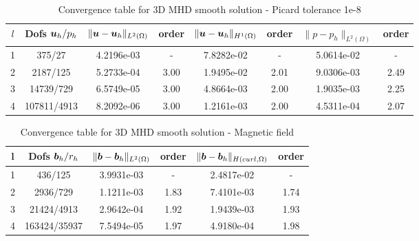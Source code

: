 \begin{table}[h!] \small
\begin{center}
\begin{tabular}{cccccccc}
\hline
$l$ &    Dofs $\boldsymbol u_h/p_h$ & $\|\boldsymbol u-\boldsymbol u_h\|_{L^2(\Omega)}$ & order & $\|\boldsymbol u-\boldsymbol u_h\|_{H^1(\Omega)}$ & order &        $\|{p}-{p}_h\|_{L^2(\Omega)}$ & order \\
\hline
  1 &     375/27 &  4.2196e-03 &     - &  7.8282e-02 &     - &  5.0614e-02 &      - \\
  2 &    2187/125 &  5.2733e-04 &     3.00 &  1.9495e-02 &     2.01 &  9.0306e-03 &      2.49 \\

 3 &   14739/729 &  6.5749e-05 &     3.00 &  4.8664e-03 &     2.00 &  1.9035e-03 &      2.25 \\

 4 &  107811/4913 &  8.2092e-06 &     3.00 &  1.2161e-03 &     2.00 &  4.5311e-04 &      2.07 \\

\hline
\end{tabular}
\caption{Convergence table for 3D MHD smooth solution - Picard tolerance 1e-8}
\label{tab:MHD_3D_smooth_fluids}
\end{center}
\end{table}


\begin{table}[h!] \small
\begin{center}
\begin{tabular}{cccccc}
\hline
l &    Dofs $\boldsymbol b_h/r_h$ & $\|\boldsymbol b-\boldsymbol b_h\|_{L^2(\Omega)}$ & order & $\|\boldsymbol b-\boldsymbol b_h\|_{H(curl,\Omega)}$ & order \\
\hline
1 &     436/125 &  3.9931e-03 &     - &  2.4817e-02 &        - \\
2 &    2936/729 &  1.1211e-03 &     1.83 &  7.4101e-03 &        1.74 \\
3 &   21424/4913 &  2.9642e-04 &     1.92 &  1.9439e-03 &        1.93 \\
4 &  163424/35937 &  7.5494e-05 &     1.97 &  4.9180e-04 &        1.98 \\
\hline
\end{tabular}
\caption{Convergence table for 3D MHD smooth solution - Magnetic field}
\label{tab:MHD_3D_smooth_magnetic}
\end{center}
\end{table}



